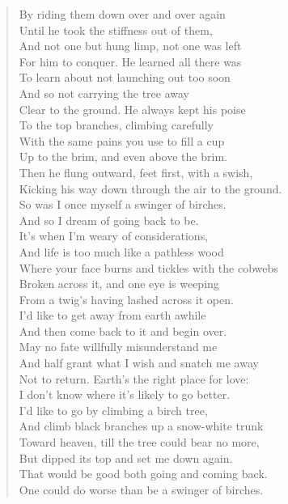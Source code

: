 \begin{verse}
    By riding them down over and over again\\
    Until he took the stiffness out of them,\\
    And not one but hung limp, not one was left\\
    For him to conquer. He learned all there was\\
    To learn about not launching out too soon\\
    And so not carrying the tree away\\
    Clear to the ground. He always kept his poise\\
    To the top branches, climbing carefully\\
    With the same pains you use to fill a cup\\
    Up to the brim, and even above the brim.\\
    Then he flung outward, feet first, with a swish,\\
    Kicking his way down through the air to the ground.\\
    So was I once myself a swinger of birches.\\
    And so I dream of going back to be.\\
    It’s when I’m weary of considerations,\\
    And life is too much like a pathless wood\\
    Where your face burns and tickles with the cobwebs\\
    Broken across it, and one eye is weeping\\
    From a twig’s having lashed across it open.\\
    I'd like to get away from earth awhile\\
    And then come back to it and begin over.\\
    May no fate willfully misunderstand me\\
    And half grant what I wish and snatch me away\\
    Not to return. Earth’s the right place for love:\\
    I don’t know where it's likely to go better.\\
    I'd like to go by climbing a birch tree,\\
    And climb black branches up a snow-white trunk\\
    Toward heaven, till the tree could bear no more,\\
    But dipped its top and set me down again.\\
    That would be good both going and coming back.\\
    One could do worse than be a swinger of birches.\\
\end{verse}

